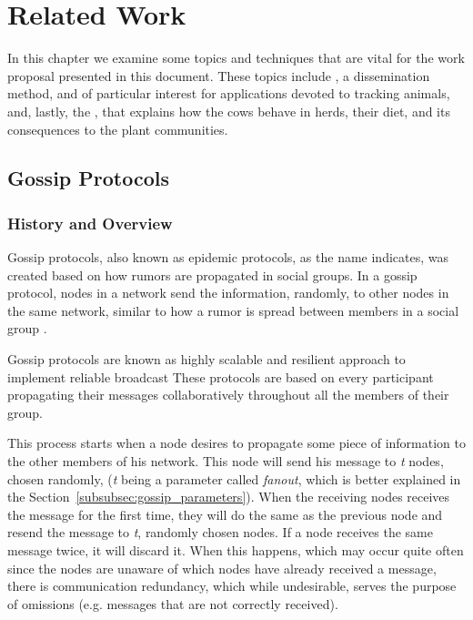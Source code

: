 
%

\chapter{Related Work}
\label{cha:related_work}
In this chapter we examine some topics and techniques that are vital for the work proposal
presented in this document. These topics include , a dissemination
method,  and of particular interest for applications
devoted to tracking animals, and, lastly, the , that explains how the cows behave in herds,
their diet, and its consequences to the plant communities. %

\section{Gossip Protocols}
\label{sec:gossip_protocols}

\subsection{History and Overview}
\label{subsec:gossip_history_overview}
Gossip protocols, also known as epidemic protocols, as the name indicates, was created
based on how rumors are propagated in social groups. In a gossip protocol, nodes in a
network send the information, randomly, to other nodes in the same network, similar to how a
rumor is spread between members in a social group \cite{Leitao2007}.

Gossip protocols are known as highly scalable and resilient approach to implement reliable
broadcast %
These protocols are based on every participant propagating their messages collaboratively
throughout all the members of their group.

This process starts when a node desires to propagate some piece of information to the other
members of his network. This node will send his message to \textit{t} nodes, chosen randomly,
(\textit{t} being a parameter called \textit{fanout}, which is better explained in the
Section~\ref{subsubsec:gossip_parameters}). When the receiving nodes receives the message for
the first time, they will do the same as the previous node and resend the message to
\textit{t}, randomly chosen nodes. If a node receives the same message twice, it will discard
it. When this happens, which may occur quite often since the nodes are unaware of which nodes
have already received a message, there is communication redundancy, which while undesirable,
serves the purpose of %
omissions (e.g. messages that are not correctly received).

